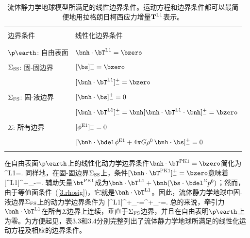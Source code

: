 {%
\begin{table}
\label{table3.4}
\centering
\begin{tabular}{|l|l|} \hline
& \\
边界条件 & 线性化边界条件 \\
& \\ \hline
& \\
$\p\earth$: 自由表面 & $\bnh\cdot\bT^{\rm L1}=\bzero$ \\
& \\
$\Sigma_{\rm SS}$: 固-固边界 & $[\bs]^+_-=\bzero$ \\
\vspace{-1.5 mm} & \vspace{-1.5 mm} \\
& $[\bnh\cdot\bT^{\rm L1}]^+_-=\bzero$ \\
& \\
$\Sigma_{\rm FS}$: 固-液边界 & $[\bnh\cdot\bs]^+_-=0$ \\
\vspace{-1.5 mm} & \vspace{-1.5 mm} \\
& $[\bnh\cdot\bT^{\rm L1}]^+_-=\bnh[\bnh\cdot\bT^{\rm L1}\cdot\bnh]^+_-=\bzero$ \\
& \\
$\Sigma$: 所有边界 & $[\phi^{\rm E1}]^+_-=0$ \\
\vspace{-1.5 mm} & \vspace{-1.5 mm} \\
& $[\bnh\cdot\bdel\phi^{\rm E1}+4\pi G\rho^0\,\bnh\cdot\bs]^+_-=0$ \\
& \\ \hline
\end{tabular}
\caption[hydrobc]{流体静力学地球模型所满足的线性边界条件。运动方程和边界条件都可以最简便地用拉格朗日柯西应力增量${\bf T}^{\rm L1}$表示。}
\end{table}
在自由表面$\p\earth$上的线性化动力学边界条件$\bnh\cdot\bT^{\rm PK1}=\bzero$简化为
\eq
\label{3.hydrobc1}
\bnh\cdot\bT^{\rm L1}=\bzero.
\en
同样地，在固-固边界$\Sigma_{\rm SS}$上，条件$[\bnh\cdot\bT^{\rm PK1}]^+_-=\bzero$意味着
\eq
\label{3.hydrobc2}
[\bnh\cdot\bT^{\rm L1}]^+_-=\bzero.
\en
辅助矢量$\bt^{\rm PK1}$成为$\bnh\cdot\bT^{\rm L1}+\bnh(\bs\cdot\bdel^{\Sigma}p^0)$；然而，由于等值面条件~(\ref{3.rhosig})，它就是$\bnh\cdot\bT^{\rm L1}$。因此，流体静力学地球中固-液边界$\Sigma_{\rm FS}$上的动力学边界条件为
\eq
\label{3.hydrobc3}
[\bnh\cdot\bT^{\rm L1}]^+_-=^+_-=\bzero.
\en
总的来说，牵引力$\bnh\cdot\bT^{\rm L1}$在所有$\Sigma$边界上连续，垂直于$\Sigma_{\rm FS}$边界，并且在自由表明$\p\earth$上为零。为方便起见，表3.3和3.4分别完整列出了流体静力学地球所满足的线性化运动方程及相应的边界条件。
%
%

}
